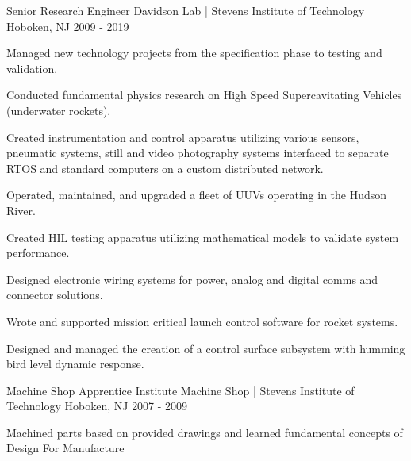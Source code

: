 \begin{cventries}
  \cventry
    {Senior Research Engineer} %
    {Davidson Lab | Stevens Institute of Technology} %
    {Hoboken, NJ} %
    {2009 - 2019} %
    {
      \begin{cvitems} %
        \item {Managed new technology projects from the specification phase to testing and validation.} 
        \item {Conducted fundamental physics research on High Speed Supercavitating Vehicles (underwater rockets).}
        \item {Created instrumentation and control apparatus utilizing various sensors, pneumatic systems, still and video photography systems
            interfaced to separate RTOS and standard computers on a custom distributed network.} 
        \item {Operated, maintained, and upgraded a fleet of UUVs operating in the Hudson River.}
        \item {Created HIL testing apparatus utilizing mathematical models to validate system performance.} 
        \item {Designed electronic wiring systems for power, analog and digital comms and connector solutions.}
        \item {Wrote and supported mission critical launch control software for rocket systems.} 
        \item {Designed and managed the creation of a control surface subsystem with humming bird level dynamic response.}
      \end{cvitems}
    }


  \cventry
    {Machine Shop Apprentice} %
    {Institute Machine Shop | Stevens Institute of Technology} %
    {Hoboken, NJ} %
    {2007 - 2009} %
    {%
      \begin{cvitems} %
        \item {Machined parts based on provided drawings and learned fundamental concepts of Design For Manufacture}
      \end{cvitems}
    }

\end{cventries}
